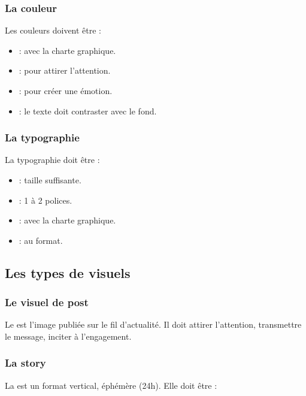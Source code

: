 \subsubsection{La couleur}

Les couleurs doivent être :

\begin{itemize}
    \item {} : avec la charte graphique.
    \item {} : pour attirer l'attention.
    \item {} : pour créer une émotion.
    \item {} : le texte doit contraster avec le fond.
\end{itemize}

\subsubsection{La typographie}

La typographie doit être :

\begin{itemize}
    \item {} : taille suffisante.
    \item {} : 1 à 2 polices.
    \item {} : avec la charte graphique.
    \item {} : au format.
\end{itemize}

\subsection{Les types de visuels}

\subsubsection{Le visuel de post}

Le  est l'image publiée sur le fil d'actualité. Il doit attirer l'attention, transmettre le message, inciter à l'engagement.

\subsubsection{La story}

La  est un format vertical, éphémère (24h). Elle doit être :

